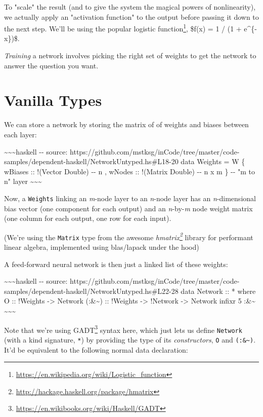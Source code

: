 \documentclass[]{article}
\renewcommand{\href}[2]{#2\footnote{\url{#1}}}
\begin{document}
To "scale" the result (and to give the system the magical powers of
nonlinearity), we actually apply an "activation function" to the output before
passing it down to the next step. We'll be using the popular
\href{https://en.wikipedia.org/wiki/Logistic_function}{logistic function},
\$f(x) = 1 / (1 + e\^{}\{-x\})\$.

\emph{Training} a network involves picking the right set of weights to get the
network to answer the question you want.

\section{Vanilla Types}

We can store a network by storing the matrix of of weights and biases between
each layer:

\textasciitilde{}\textasciitilde{}\textasciitilde{}haskell -\/- source:
https://github.com/mstksg/inCode/tree/master/code-samples/dependent-haskell/NetworkUntyped.hs\#L18-20
data Weights = W \{ wBiases :: !(Vector Double) -\/- n , wNodes :: !(Matrix
Double) -\/- n x m \} -\/- "m to n" layer
\textasciitilde{}\textasciitilde{}\textasciitilde{}

Now, a \texttt{Weights} linking an \emph{m}-node layer to an \emph{n}-node layer
has an \emph{n}-dimensional bias vector (one component for each output) and an
\emph{n}-by-\emph{m} node weight matrix (one column for each output, one row for
each input).

(We're using the \texttt{Matrix} type from the awesome
\emph{\href{http://hackage.haskell.org/package/hmatrix}{hmatrix}} library for
performant linear algebra, implemented using blas/lapack under the hood)

A feed-forward neural network is then just a linked list of these weights:

\textasciitilde{}\textasciitilde{}\textasciitilde{}haskell -\/- source:
https://github.com/mstksg/inCode/tree/master/code-samples/dependent-haskell/NetworkUntyped.hs\#L22-28
data Network :: * where O :: !Weights -\textgreater{} Network
(:\&\textasciitilde{}) :: !Weights -\textgreater{} !Network -\textgreater{}
Network infixr 5 :\&\textasciitilde{}
\textasciitilde{}\textasciitilde{}\textasciitilde{}

Note that we're using \href{https://en.wikibooks.org/wiki/Haskell/GADT}{GADT}
syntax here, which just lets us define \texttt{Network} (with a kind signature,
\texttt{*}) by providing the type of its \emph{constructors}, \texttt{O} and
\texttt{(:\&\textasciitilde{})}. It'd be equivalent to the following normal data
declaration:
\end{document}

